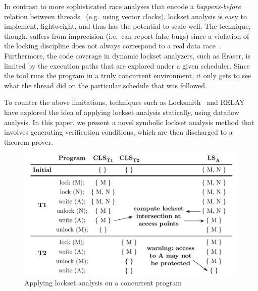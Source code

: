 In contrast to more sophisticated race analyses that encode a \emph{happens-before} relation between threads~\cite{lamport1978time} (e.g.\ using vector clocks), lockset analysis is easy to implement, lightweight, and thus has the potential to scale well.  The technique, though, suffers from imprecision (i.e.\ can report false bugs) since a violation of the locking discipline does not always correspond to a real data race~\cite{savage1997eraser, pozniansky2003efficient, o2003hybrid, elmas2007goldilocks, flanagan2009fasttrack}. Furthermore, the code coverage in dynamic lockset analyzers, such as Eraser, is limited by the execution paths that are explored under a given scheduler. Since the tool runs the program in a truly concurrent environment, it only gets to see what the thread did on the particular schedule that was followed.

To counter the above limitations, techniques such as Locksmith~\cite{pratikakis2006locksmith} and RELAY~\cite{voung2007relay} have explored the idea of applying lockset analysis statically, using dataflow analysis. In this paper, we present a novel symbolic lockset analysis method that involves generating verification conditions, which are then discharged to a theorem prover.

\begin{figure}[t]
\centering
\includegraphics[width=1\linewidth]{img/lockset.pdf}
\caption{Applying lockset analysis on a concurrent program}
\label{fig:locksets}
\end{figure}

